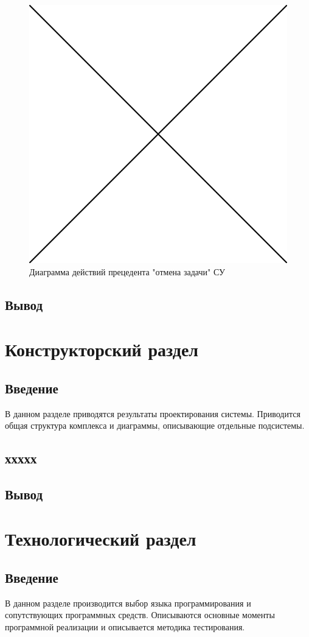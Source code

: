 \documentclass[a4paper,12pt]{report}
\numberwithin{equation}{section}
\begin{document}
\begin{figure}
  \centering
  \includegraphics[width=.6\linewidth]{img/placeholder} %
  \caption{Диаграмма действий прецедента "отмена задачи" СУ}
  \label{fig:logic-cancel}
\end{figure}

\subsection{Вывод}

\clearpage
\section{Конструкторский раздел}
\subsection{Введение}
В данном разделе приводятся результаты проектирования системы.
Приводится общая структура комплекса и диаграммы, описывающие отдельные подсистемы.

\subsection{ххххх}

\subsection{Вывод}

\clearpage
\section{Технологический раздел}
\subsection{Введение}
В данном разделе производится выбор языка программирования и сопутствующих программных средств. 
Описываются основные моменты программной реализации и описывается методика тестирования.
\end{document}
